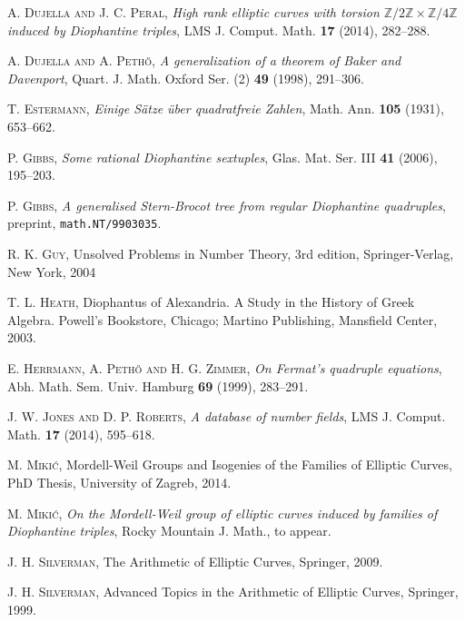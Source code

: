 \documentclass[11pt]{amsart}
\theoremstyle{plain}
\theoremstyle{remark}
\begin{document}
\begin{thebibliography}{}
 \textsc{A. Dujella and J. C. Peral}, \textit{High rank elliptic curves with torsion $\mathbb{Z}/2\mathbb{Z} \times \mathbb{Z}/4\mathbb{Z}$ induced by Diophantine triples}, LMS J. Comput. Math. {\bf 17} (2014), 282--288.

 \textsc{A. Dujella and A. Peth\H{o}}, \textit{A generalization of a theorem of Baker and Davenport}, Quart. J. Math. Oxford Ser. (2) {\bf 49} (1998), 291--306.

 \textsc{T. Estermann}, \textit{Einige S\"atze \"uber quadratfreie Zahlen}, Math. Ann. {\bf 105} (1931), 653--662.

 \textsc{P. Gibbs}, \textit{Some rational Diophantine sextuples},
Glas. Mat. Ser. III {\bf 41} (2006), 195--203.

 \textsc{P. Gibbs}, \textit{A generalised Stern-Brocot tree from regular Diophantine quadruples}, preprint, {\tt math.NT/9903035}.

 \textsc{R. K. Guy}, Unsolved Problems in Number Theory, 3rd edition, Springer-Verlag, New York, 2004

 \textsc{T. L. Heath}, Diophantus of Alexandria. A Study in the History of Greek Algebra. Powell's Bookstore, Chicago; Martino Publishing, Mansfield Center, 2003.

 \textsc{E. Herrmann, A. Peth\H{o} and H. G. Zimmer}, \textit{On Fermat's quadruple equations}, Abh. Math. Sem. Univ. Hamburg {\bf 69} (1999), 283--291.

 \textsc{J. W. Jones and D. P. Roberts}, \textit{A database of number fields}, LMS J. Comput. Math. {\bf 17} (2014), 595--618.

 \textsc{M. Miki\'c}, Mordell-Weil Groups and Isogenies of the Families of Elliptic Curves, PhD Thesis, University of Zagreb, 2014.

 \textsc{M. Miki\'c}, \textit{On the Mordell-Weil group of elliptic curves induced by families of Diophantine triples}, Rocky Mountain J. Math., to appear.

 \textsc{J. H. Silverman}, The Arithmetic of Elliptic Curves, Springer, 2009.

 \textsc{J. H. Silverman}, Advanced Topics in the Arithmetic of Elliptic Curves, Springer, 1999.

\end{thebibliography}
\end{document}
